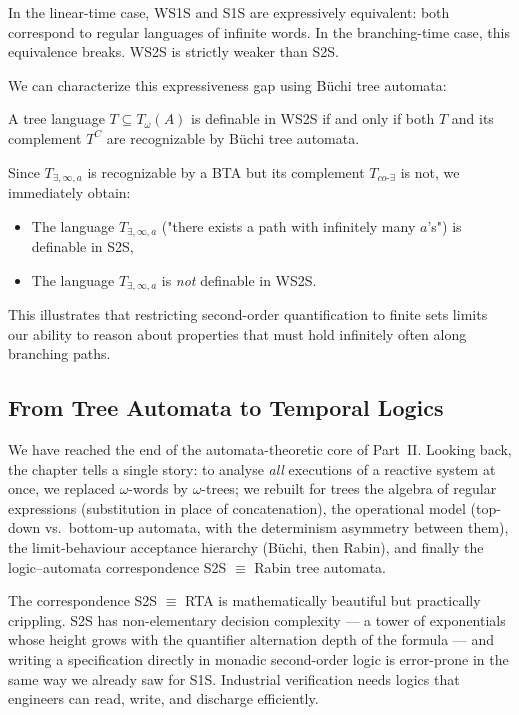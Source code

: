 In the linear-time case, WS1S and S1S are expressively equivalent: both correspond to regular languages of infinite words. In the branching-time case, this equivalence breaks. WS2S is strictly weaker than S2S.

We can characterize this expressiveness gap using Büchi tree automata:

\begin{theorem}
A tree language $T \subseteq T_\omega(A)$ is definable in WS2S if and only if both $T$ and its complement $T^C$ are recognizable by Büchi tree automata.
\end{theorem}

Since $T_{\exists, \infty, a}$ is recognizable by a BTA but its complement $T_{co\text{-}\exists}$ is not, we immediately obtain:
\begin{itemize}
    \item The language $T_{\exists, \infty, a}$ ("there exists a path with infinitely many $a$'s") is definable in S2S,
    \item The language $T_{\exists, \infty, a}$ is \emph{not} definable in WS2S.
\end{itemize}
This illustrates that restricting second-order quantification to finite sets limits our ability to reason about properties that must hold infinitely often along branching paths.

\subsection{From Tree Automata to Temporal Logics}
\label{sec:toward-temporal-logics}

We have reached the end of the automata-theoretic core of Part~II. Looking back, the chapter tells a single story: to analyse \emph{all} executions of a reactive system at once, we replaced $\omega$-words by $\omega$-trees; we rebuilt for trees the algebra of regular expressions (substitution in place of concatenation), the operational model (top-down vs.\ bottom-up automata, with the determinism asymmetry between them), the limit-behaviour acceptance hierarchy (Büchi, then Rabin), and finally the logic--automata correspondence S2S $\equiv$ Rabin tree automata.

The correspondence S2S $\equiv$ RTA is mathematically beautiful but practically crippling. S2S has non-elementary decision complexity --- a tower of exponentials whose height grows with the quantifier alternation depth of the formula --- and writing a specification directly in monadic second-order logic is error-prone in the same way we already saw for S1S. Industrial verification needs logics that engineers can read, write, and discharge efficiently.

